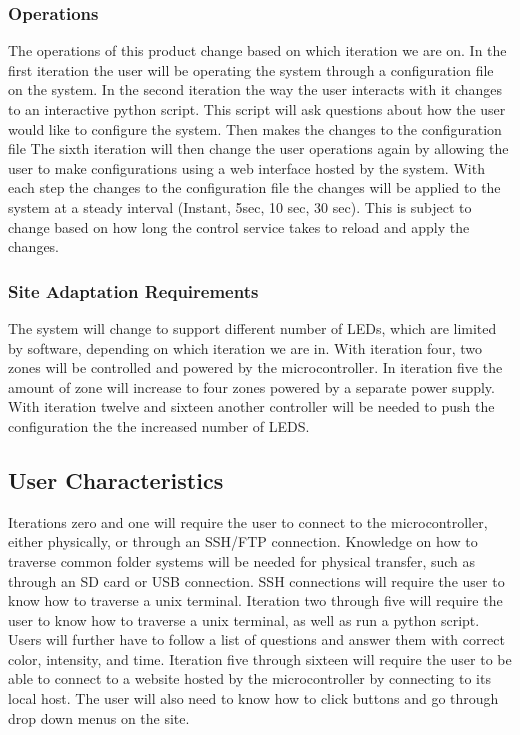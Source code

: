 \documentclass[onecolumn, draftclsnofoot,10pt, compsoc]{IEEEtran}
\begin{document}
				\subsubsection*{Operations}
					The operations of this product change based on which iteration we are on. In the first iteration the user will be operating the system through a configuration file on the system. In the second iteration
					the way the user interacts with it changes to an interactive python script. This script will ask questions about how the user would like to configure the system. Then makes the changes to the configuration file
					The sixth iteration will then change the user operations again by allowing the user to make configurations using a web interface hosted by the system. With each step the changes to the configuration file the
					changes will be applied to the system at a steady interval (Instant, 5sec, 10 sec, 30 sec). This is subject to change based on how long the control service takes to reload and apply the changes.
				\subsubsection*{Site Adaptation Requirements}
					The system will change to support different number of LEDs, which are limited by software, depending on which iteration we are in. With iteration four, two zones will be controlled and powered by the microcontroller.
					In iteration five the amount of zone will increase to four zones powered by a separate power supply. With iteration twelve and sixteen another controller will be needed to push the configuration the the increased number
					of LEDS.



		\subsection*{User Characteristics}
		Iterations zero and one will require the user to connect to the microcontroller, either physically, or through an SSH/FTP connection. Knowledge on how to traverse common folder systems will be needed for physical transfer, such as
		through an SD card or USB connection. SSH connections will require the user to know how to traverse a unix terminal.
		Iteration two through five will require the user to know how to traverse a unix terminal, as well as run a python script. Users will further have to follow a list of questions and answer them with correct color, intensity, and time.
		Iteration five through sixteen will require the user to be able to connect to a website hosted by the microcontroller by connecting to its local host. The user will also need to know how to click buttons and go through drop down menus on the site.
\end{document}

